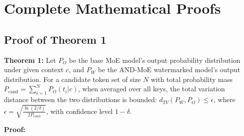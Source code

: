 \documentclass[letterpaper,twocolumn,10pt]{article}
\begin{document}
\appendix

\section{Complete Mathematical Proofs}
\label{app:proofs}

\subsection{Proof of Theorem 1}

\textbf{Theorem 1:} Let $P_O$ be the base MoE model's output probability distribution under given context $c$, and $P_W$ be the AND-MoE watermarked model's output distribution. For a candidate token set of size $N$ with total probability mass $P_{\text{cand}} = \sum_{i=1}^N P_O(t_i|c)$, when averaged over all keys, the total variation distance between the two distributions is bounded: $d_{TV}(P_W, P_O) \le \epsilon$, where $\epsilon = \sqrt{\frac{\ln(2/\delta)}{2 P_{\text{cand}}}}$, with confidence level $1-\delta$.

\textbf{Proof:}
\end{document}
